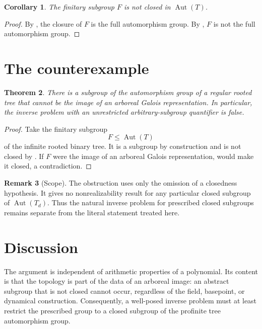 \documentclass[10pt,reqno]{amsart}
\newtheorem{theorem}{Theorem}[section]
\newtheorem{corollary}[theorem]{Corollary}
\theoremstyle{definition}
\newtheorem{remark}[theorem]{Remark}
\begin{document}
\begin{corollary}\label{cor:nonclosed}
The finitary subgroup \(F\) is not closed in \(\operatorname{Aut}(T)\).
\end{corollary}

\begin{proof}
By , the closure of \(F\) is the full automorphism group.
By , \(F\) is not the full automorphism group.
\end{proof}

\section{The counterexample}

\begin{theorem}\label{thm:main}
There is a subgroup of the automorphism group of a regular rooted tree that
cannot be the image of an arboreal Galois representation.  In particular,
the inverse problem with an unrestricted arbitrary-subgroup quantifier is
false.
\end{theorem}

\begin{proof}
Take the finitary subgroup
\[
 F\leq\operatorname{Aut}(T)
\]
of the infinite rooted binary tree.  It is a subgroup by construction and is
not closed by .  If \(F\) were the image of an arboreal
Galois representation,  would make it closed, a
contradiction.
\end{proof}

\begin{remark}[Scope]\label{rem:scope}
The obstruction uses only the omission of a closedness hypothesis.  It gives
no nonrealizability result for any particular closed subgroup of
\(\operatorname{Aut}(T_d)\).  Thus the natural inverse problem for prescribed
closed subgroups remains separate from the literal statement treated here.
\end{remark}

\section{Discussion}

The argument is independent of arithmetic properties of a polynomial.  Its
content is that the topology is part of the data of an arboreal image: an
abstract subgroup that is not closed cannot occur, regardless of the field,
basepoint, or dynamical construction.  Consequently, a well-posed inverse
problem must at least restrict the prescribed group to a closed subgroup of
the profinite tree automorphism group.
\end{document}

